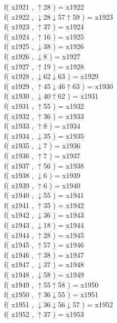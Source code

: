 f( x1921 , $\uparrow$28 ) = x1922 \\
f( x1922 , $\downarrow$28$\downarrow$57$\uparrow$59 ) = x1923 \\
f( x1923 , $\uparrow$37 ) = x1924 \\
f( x1924 , $\uparrow$16 ) = x1925 \\
f( x1925 , $\downarrow$38 ) = x1926 \\
f( x1926 , $\downarrow$8 ) = x1927 \\
f( x1927 , $\uparrow$19 ) = x1928 \\
f( x1928 , $\downarrow$62$\downarrow$63 ) = x1929 \\
f( x1929 , $\uparrow$45$\downarrow$46$\uparrow$63 ) = x1930 \\
f( x1930 , $\downarrow$40$\uparrow$62 ) = x1931 \\
f( x1931 , $\uparrow$55 ) = x1932 \\
f( x1932 , $\uparrow$36 ) = x1933 \\
f( x1933 , $\uparrow$8 ) = x1934 \\
f( x1934 , $\downarrow$35 ) = x1935 \\
f( x1935 , $\downarrow$7 ) = x1936 \\
f( x1936 , $\uparrow$7 ) = x1937 \\
f( x1937 , $\uparrow$56 ) = x1938 \\
f( x1938 , $\downarrow$6 ) = x1939 \\
f( x1939 , $\uparrow$6 ) = x1940 \\
f( x1940 , $\downarrow$55 ) = x1941 \\
f( x1941 , $\uparrow$35 ) = x1942 \\
f( x1942 , $\downarrow$36 ) = x1943 \\
f( x1943 , $\downarrow$18 ) = x1944 \\
f( x1944 , $\uparrow$28 ) = x1945 \\
f( x1945 , $\uparrow$57 ) = x1946 \\
f( x1946 , $\uparrow$38 ) = x1947 \\
f( x1947 , $\downarrow$37 ) = x1948 \\
f( x1948 , $\downarrow$58 ) = x1949 \\
f( x1949 , $\uparrow$55$\uparrow$58 ) = x1950 \\
f( x1950 , $\uparrow$36$\downarrow$55 ) = x1951 \\
f( x1951 , $\downarrow$36$\downarrow$56$\downarrow$57 ) = x1952 \\
f( x1952 , $\uparrow$37 ) = x1953 \\
